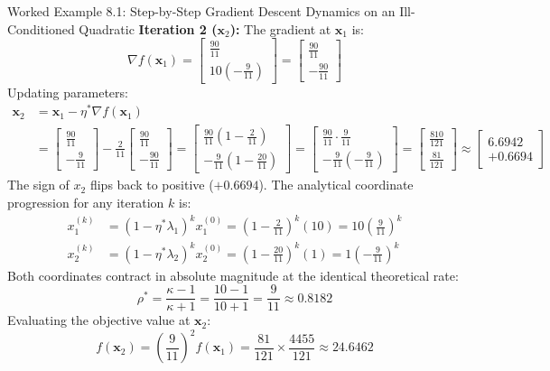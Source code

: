 \begin{examplebox}[breakable]{Worked Example 8.1: Step-by-Step Gradient Descent Dynamics on an Ill-Conditioned Quadratic}
\textbf{Iteration 2 ($\mathbf{x}_2$):}
The gradient at $\mathbf{x}_1$ is:
\begin{equation}
\nabla f(\mathbf{x}_1) = \begin{bmatrix} \frac{90}{11} \\ 10\left(-\frac{9}{11}\right) \end{bmatrix} = \begin{bmatrix} \frac{90}{11} \\ -\frac{90}{11} \end{bmatrix}
\end{equation}
Updating parameters:
\begin{align}
\mathbf{x}_2 &= \mathbf{x}_1 - \eta^* \nabla f(\mathbf{x}_1) \nonumber \\
&= \begin{bmatrix} \frac{90}{11} \\ -\frac{9}{11} \end{bmatrix} - \frac{2}{11} \begin{bmatrix} \frac{90}{11} \\ -\frac{90}{11} \end{bmatrix}
= \begin{bmatrix} \frac{90}{11}\left(1 - \frac{2}{11}\right) \\ -\frac{9}{11}\left(1 - \frac{20}{11}\right) \end{bmatrix}
= \begin{bmatrix} \frac{90}{11} \cdot \frac{9}{11} \\ -\frac{9}{11} \left(-\frac{9}{11}\right) \end{bmatrix}
= \begin{bmatrix} \frac{810}{121} \\ \frac{81}{121} \end{bmatrix} \approx \begin{bmatrix} 6.6942 \\ +0.6694 \end{bmatrix}
\end{align}
The sign of $x_2$ flips back to positive ($+0.6694$).
The analytical coordinate progression for any iteration $k$ is:
\begin{align}
x_1^{(k)} &= \left(1 - \eta^* \lambda_1\right)^k x_1^{(0)} = \left(1 - \frac{2}{11}\right)^k (10) = 10 \left(\frac{9}{11}\right)^k \\
x_2^{(k)} &= \left(1 - \eta^* \lambda_2\right)^k x_2^{(0)} = \left(1 - \frac{20}{11}\right)^k (1) = 1 \left(-\frac{9}{11}\right)^k
\end{align}
Both coordinates contract in absolute magnitude at the identical theoretical rate:
\begin{equation}
\rho^* = \frac{\kappa - 1}{\kappa + 1} = \frac{10 - 1}{10 + 1} = \frac{9}{11} \approx 0.8182
\end{equation}
Evaluating the objective value at $\mathbf{x}_2$:
\begin{equation}
f(\mathbf{x}_2) = \left(\frac{9}{11}\right)^2 f(\mathbf{x}_1) = \frac{81}{121} \times \frac{4455}{121} \approx 24.6462
\end{equation}


\end{examplebox}
